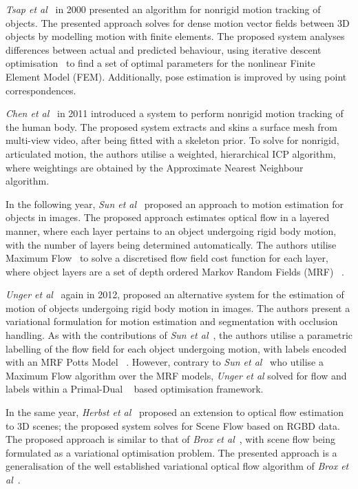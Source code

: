 \textit{Tsap et al}~\cite{Tsap2000} in 2000 presented an algorithm for nonrigid motion 
tracking of objects. The presented approach solves for dense motion vector fields between 
3D objects by modelling motion with finite elements. The proposed system analyses differences 
between actual and predicted behaviour, using iterative descent optimisation~\cite{IDO} to find 
a set of optimal parameters for the nonlinear Finite Element Model (FEM). Additionally, pose 
estimation is improved by using point correspondences.

\textit{Chen et al}~\cite{Chen2011} in 2011 introduced a system to perform nonrigid motion 
tracking of the human body. The proposed system extracts and skins a surface mesh from 
multi-view video, after being fitted with a skeleton prior. To solve for nonrigid, articulated 
motion, the authors utilise a weighted, hierarchical ICP algorithm, where weightings are obtained 
by the Approximate Nearest Neighbour~\cite{Indyk2000} algorithm.

In the following year, \textit{Sun et al}~\cite{Sun2012} proposed an approach to motion estimation 
for objects in images. The proposed approach estimates optical flow in a layered manner, where each 
layer pertains to an object undergoing rigid body motion, with the number of layers being determined 
automatically. The authors utilise Maximum Flow~\cite{Lamich2017} to solve a discretised flow field cost 
function for each layer, where object layers are a set of depth ordered Markov Random Fields (MRF) 
~\cite{BishopPRML, Murphy2012ML}.

\textit{Unger et al}~\cite{Unger2012} again in 2012, proposed an alternative system for the 
estimation of motion of objects undergoing rigid body motion in images. The authors present a 
variational formulation for motion estimation and segmentation with occlusion handling. As with 
the contributions of \textit{Sun et al}~\cite{Sun2012}, the authors utilise a parametric labelling 
of the flow field for each object undergoing motion, with labels encoded with an MRF Potts Model 
~\cite{Levada2008}. However, contrary to \textit{Sun et al}~\cite{Sun2012} who utilise a Maximum Flow 
algorithm over the MRF models, \textit{Unger et al} solved for flow and labels within a Primal-Dual 
~\cite{Boyd2004Convex} based optimisation framework.

In the same year, \textit{Herbst et al}~\cite{Herbst2013} proposed an extension to optical 
flow estimation to 3D scenes; the proposed system solves for Scene Flow based on RGBD data. 
The proposed approach is similar to that of \textit{Brox et al}~\cite{Brox2004}, with scene flow 
being formulated as a variational optimisation problem. The presented approach is a generalisation 
of the well established variational optical flow algorithm of \textit{Brox et al}~\cite{Brox2004}.

